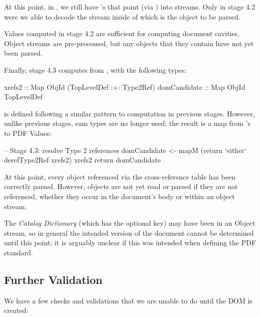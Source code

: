 At this point, in , we still have 's that point
(via ) into  streams.
%
Only in stage 4.2 were we able to decode the stream inside of
which is the object to be parsed.

Values computed in stage 4.2 are sufficient for computing document cavities.
%
Object streams are pre-processed, but any objects that they contain have not yet been parsed.

Finally, stage 4.3 computes  from , with the following types:
\begin{codeNoExecute}
  xrefs2       :: Map ObjId (TopLevelDef :+: Type2Ref) 
  domCandidate :: Map ObjId TopLevelDef
\end{codeNoExecute}
 is defined following a similar pattern to computation in previous stages.
%
However, unlike previous stages, sum types are no longer used; the result is a map from  's to PDF Values:
\begin{code}
    -- Stage 4.3: resolve Type 2 references
    domCandidate <- mapM
                     (return `either` derefType2Ref xrefs2)
                     xrefs2
    return domCandidate
\end{code}

At this point, every object referenced via the cross-reference table has been correctly parsed.
%
However, objects are not yet read or parsed if they are not referenced, whether they occur in the document's body or within an object stream.

The \emph{Catalog Dictionary} (which has the optional
 key) may have been in an Object stream, so in general the intended version of the document cannot be determined until this point;
%
it is arguably unclear if this was intended when defining the PDF standard.

\subsection{Further Validation}
\label{sec:validating}

We have a few checks and validations that we are unable to do until
the DOM is created:

